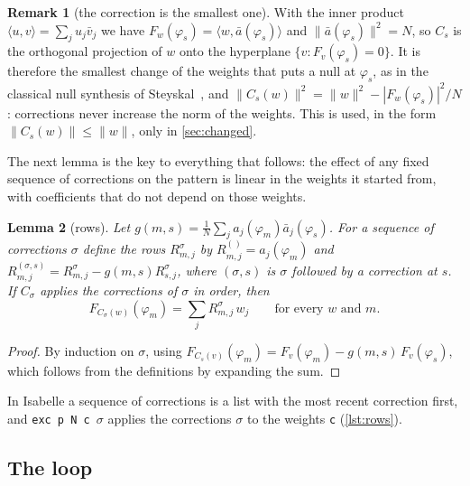 \documentclass[11pt]{amsart}
\theoremstyle{plain}
\newtheorem{lemma}{Lemma}[section]
\theoremstyle{definition}
\newtheorem{remark}[lemma]{Remark}
\newcommand{\thy}[1]{\texttt{#1}}
\newcommand{\ab}{\bar a}
\begin{document}


\begin{remark}[the correction is the smallest one]\label{rem:projection}
With the inner product $\langle u, v\rangle = \sum_j u_j \bar v_j$ we have
$F_w(\varphi_s) = \langle w, \ab(\varphi_s)\rangle$ and $\|\ab(\varphi_s)\|^2 = N$, so $C_s$ is the
orthogonal projection of $w$ onto the hyperplane $\{v : F_v(\varphi_s) = 0\}$.  It is therefore the
smallest change of the weights that puts a null at $\varphi_s$, as in the classical null synthesis of
Steyskal~\cite{Steyskal1982}, and
$\|C_s(w)\|^2 = \|w\|^2 - |F_w(\varphi_s)|^2/N$: corrections never increase the norm of the weights.
This is used, in the form $\|C_s(w)\| \le \|w\|$, only in \cref{sec:changed}.
\end{remark}

The next lemma is the key to everything that follows: the effect of any fixed sequence of
corrections on the pattern is linear in the weights it started from, with coefficients that do not
depend on those weights.

\begin{lemma}[rows]\label{lem:rows}
Let $g(m,s) = \frac1N \sum_j a_j(\varphi_m)\ab_j(\varphi_s)$.  For a sequence of corrections
$\sigma$ define the \emph{rows} $R^\sigma_{m,j}$ by $R^{()}_{m,j} = a_j(\varphi_m)$ and
$R^{(\sigma,s)}_{m,j} = R^\sigma_{m,j} - g(m,s) R^\sigma_{s,j}$, where $(\sigma, s)$ is $\sigma$
followed by a correction at $s$.  If $C_\sigma$ applies the corrections of $\sigma$ in order, then
\[ F_{C_\sigma(w)}(\varphi_m) = \sum_j R^\sigma_{m,j}\, w_j \qquad\text{for every } w \text{ and } m. \]
\end{lemma}

\begin{proof}
By induction on $\sigma$, using $F_{C_s(v)}(\varphi_m) = F_v(\varphi_m) - g(m,s)\,F_v(\varphi_s)$,
which follows from the definitions by expanding the sum.
\end{proof}

In Isabelle a sequence of corrections is a list with the most recent correction first, and
\thy{exc p N c $\sigma$} applies the corrections $\sigma$ to the weights \thy{c} (\cref{lst:rows}).




\subsection{The loop}\label{sec:loop}
\end{document}
